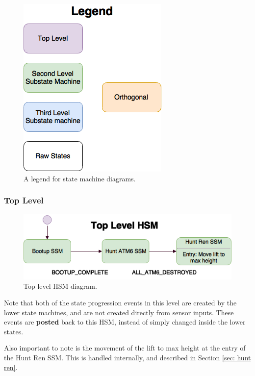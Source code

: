 \documentclass[]{article}
\begin{document}
\begin{figure}[H]
    \centering
    \includegraphics[scale=0.50]{hsm-legend.png}
    \caption{A legend for state machine diagrams.}
    \label{hsm legend}
\end{figure}


\subsubsection{Top Level}
\begin{figure}[H]
    \centering
    \includegraphics[scale=0.60]{hsm-top-level.png}
    \caption{Top level HSM diagram.}
    \label{hsm top level}
\end{figure}
Note that both of the state progression events in this level are created by the lower state machines, and are not created directly from sensor inputs. These events are \textbf{posted} back to this HSM, instead of simply changed inside the lower states.

Also important to note is the movement of the lift to max height at the entry of the Hunt Ren SSM. This is handled internally, and described in Section \ref{sec: hunt ren}.
\end{document}
